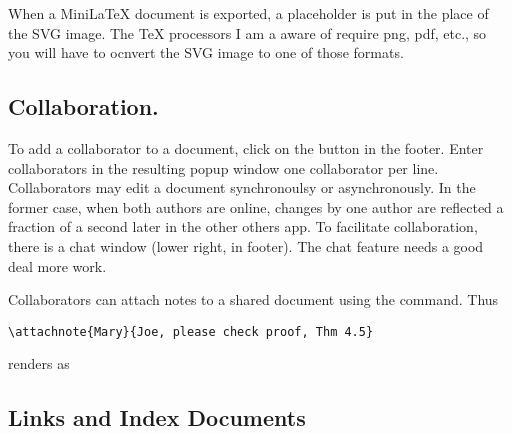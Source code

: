 
When a MiniLaTeX document is exported, a placeholder is put in the place of the SVG image.  The TeX processors I am a aware of require png, pdf, etc., so you will have to ocnvert the SVG image to one of those formats.

\subsection{Collaboration.}

To add a collaborator to a document, click on the  button in the footer.  Enter collaborators in the resulting popup window one collaborator per line.  Collaborators may edit a document synchronoulsy or asynchronously.  In the former case, when both authors are online, changes by one author are reflected a fraction of a second later in the other others app.  To facilitate collaboration, there is a chat window (lower right, in footer).  The chat feature needs a good deal more work.

Collaborators can attach notes to a shared document using the  command.  Thus

\begin{verbatim}
\attachnote{Mary}{Joe, please check proof, Thm 4.5}
\end{verbatim}

renders as

\subsection{Links and Index Documents}

